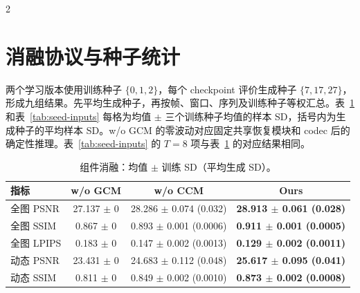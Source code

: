 \begin{multicols}{2}

\section{消融协议与种子统计}
\label{sec:supp-ablations}

两个学习版本使用训练种子 $\{0,1,2\}$，每个 checkpoint 评价生成种子 $\{7,17,27\}$，形成九组结果。先平均生成种子，再按帧、窗口、序列及训练种子等权汇总。表~\ref{tab:seed-components} 和表~\ref{tab:seed-inputs} 每格为均值 $\pm$ 三个训练种子均值的样本 SD，括号内为生成种子的平均样本 SD。w/o GCM 的零波动对应固定共享恢复模块和 codec 后的确定性推理。表~\ref{tab:seed-inputs} 的 $T=8$ 项与表~\ref{tab:seed-components} 的对应结果相同。

\end{multicols}
\begin{table}[H]
\centering\small
\setlength{\tabcolsep}{4pt}
\caption{组件消融：均值 $\pm$ 训练 SD（平均生成 SD）。}
\label{tab:seed-components}
\begin{tabular}{@{}lccc@{}}
\toprule
指标 & w/o GCM & w/o CCM & Ours \\
\midrule
全图 PSNR & 27.137 $\pm$ 0 & 28.286 $\pm$ 0.074 (0.032) & \textbf{28.913 $\pm$ 0.061 (0.028)} \\
全图 SSIM & 0.867 $\pm$ 0 & 0.893 $\pm$ 0.001 (0.0006) & \textbf{0.911 $\pm$ 0.001 (0.0005)} \\
全图 LPIPS & 0.183 $\pm$ 0 & 0.147 $\pm$ 0.002 (0.0013) & \textbf{0.129 $\pm$ 0.002 (0.0011)} \\
动态 PSNR & 23.431 $\pm$ 0 & 24.683 $\pm$ 0.112 (0.048) & \textbf{25.617 $\pm$ 0.095 (0.041)} \\
动态 SSIM & 0.811 $\pm$ 0 & 0.849 $\pm$ 0.002 (0.0010) & \textbf{0.873 $\pm$ 0.002 (0.0008)} \\
\bottomrule
\end{tabular}
\end{table}

